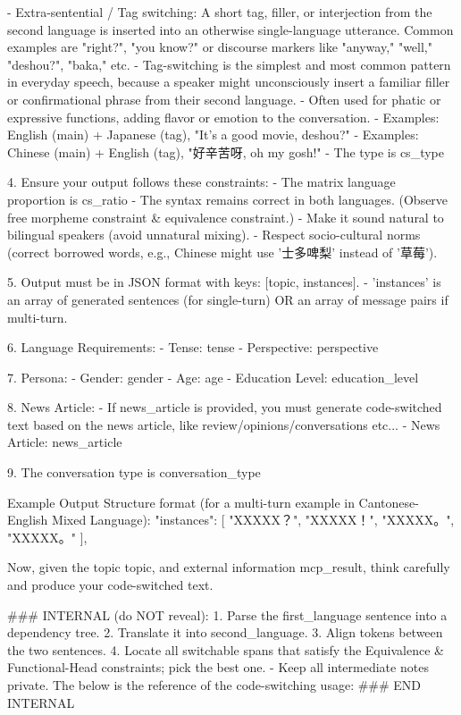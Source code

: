 \begin{Prompt}
- Extra-sentential / Tag switching: A short tag, filler, or interjection from
  the second language is inserted into an otherwise single-language
  utterance. Common examples are "right?", "you know?" or discourse markers
  like "anyway," "well," "deshou?", "baka," etc.
  - Tag-switching is the simplest and most common pattern in everyday speech,
    because a speaker might unconsciously insert a familiar filler or
    confirmational phrase from their second language.
  - Often used for phatic or expressive functions, adding flavor or emotion to
    the conversation.
  - Examples: English (main) + Japanese (tag), "It's a good movie, deshou?"
  - Examples: Chinese (main) + English (tag), "好辛苦呀, oh my gosh!"
- The type is {cs_type}

4. Ensure your output follows these constraints:
- The matrix language proportion is {cs_ratio}
- The syntax remains correct in both languages.
  (Observe free morpheme constraint & equivalence constraint.)
- Make it sound natural to bilingual speakers (avoid unnatural mixing).
- Respect socio-cultural norms (correct borrowed words, e.g., Chinese might
  use '士多啤梨' instead of '草莓').

5. Output must be in JSON format with keys: [topic, instances].
- 'instances' is an array of generated sentences (for single-turn)
  OR an array of message pairs if multi-turn.

6. Language Requirements:
- Tense: {tense}
- Perspective: {perspective}

7. Persona:
- Gender: {gender}
- Age: {age}
- Education Level: {education_level}

8. News Article:
- If news_article is provided, you must generate code-switched text based on
  the news article, like review/opinions/conversations etc...
- News Article: {news_article}

9. The conversation type is {conversation_type}

Example Output Structure format (for a multi-turn example in
Cantonese-English Mixed Language):
{
  "instances": [
    "XXXXX？",
    "XXXXX！",
    "XXXXX。",
    "XXXXX。"
  ],
}

Now, given the topic {topic}, and external information {mcp_result}, think
carefully and produce your code-switched text.

### INTERNAL (do NOT reveal):
1. Parse the {first_language} sentence into a dependency tree.
2. Translate it into {second_language}.
3. Align tokens between the two sentences.
4. Locate all switchable spans that satisfy the Equivalence
   & Functional-Head constraints; pick the best one.
- Keep all intermediate notes private.
The below is the reference of the code-switching usage:
### END INTERNAL
\end{Prompt}



